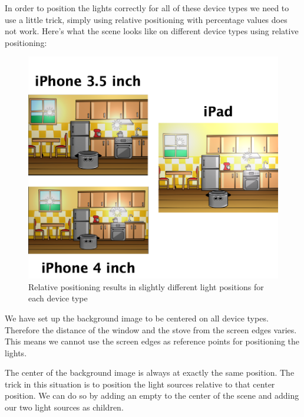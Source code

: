 In order to position the lights correctly for all of these device types we need
to use a little trick, simply using relative positioning with percentage values
does not work. Here's what the scene looks like on different device types using
relative positioning: 
\begin{figure}[H]
    \centering
    \includegraphics[width=0.8\linewidth]{images/Chapter9/light_source_relative_position.png}
    \caption{Relative positioning results in slightly different light positions
    for each device type}
\end{figure}

We have set up the background image to be centered on all device types.
Therefore the distance of the window and the stove from the screen edges varies.
This means we cannot use the screen edges as reference points for positioning
the lights.

The center of the background image is always at exactly the same position. The
trick in this situation is to position the light sources relative to that center
position. We can do so by adding an empty \ccnode{} to the center of the scene
and adding our two light sources as children.

